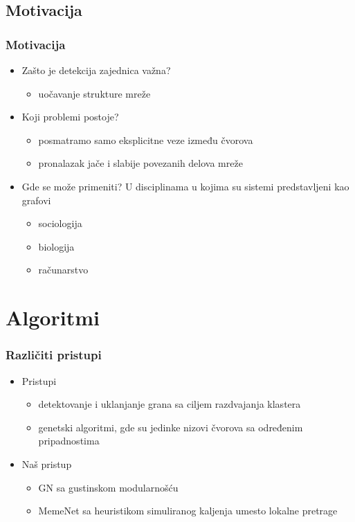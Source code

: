 \documentclass{beamer}
\begin{document}
\subsection{Motivacija}
\begin{frame}\frametitle{Motivacija}
\begin{itemize}
    \item Zašto je detekcija zajednica važna?
        \begin{itemize}
            \item uočavanje strukture mreže
        \end{itemize}
    \item Koji problemi postoje?
        \begin{itemize}
            \item posmatramo samo eksplicitne veze između čvorova
            \item pronalazak jače i slabije povezanih delova mreže
        \end{itemize}
    \item Gde se može primeniti?
    U disciplinama u kojima su sistemi predstavljeni kao grafovi
        \begin{itemize}
            \item sociologija
            \item biologija
            \item računarstvo
        \end{itemize}
\end{itemize}
\end{frame}

\section{Algoritmi} 
\begin{frame}\frametitle{Različiti pristupi}
\begin{itemize}
    \item Pristupi
        \begin{itemize}
            \item detektovanje i uklanjanje grana sa ciljem razdvajanja klastera
            \item genetski algoritmi, gde su jedinke nizovi čvorova sa određenim pripadnostima
        \end{itemize}
    \item Naš pristup
    \begin{itemize}
            \item GN sa gustinskom modularnošću
            \item MemeNet sa heuristikom simuliranog kaljenja umesto lokalne pretrage
        \end{itemize}
\end{itemize}
\end{frame}
\end{document}
